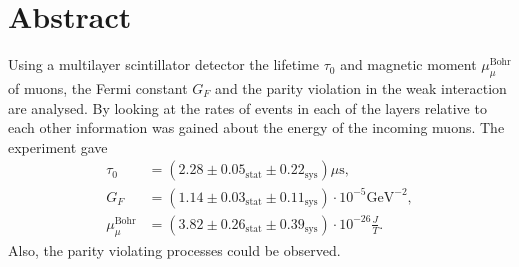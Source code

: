 \section{Abstract}
Using a multilayer scintillator detector the lifetime $\tau_0$ and magnetic moment $\mu_\mu^{\text{Bohr}}$ of muons, the Fermi constant $G_F$ and the parity violation in the weak interaction are analysed. By looking at the rates of events in each of the layers relative to each other information was gained about the energy of the incoming muons. The experiment gave
\begin{align*}
	\tau_0&=(2.28\pm0.05_{\text{stat}}\pm0.22_{\text{sys}})\mu\text{s},\\
	G_F &= (1.14 \pm 0.03_{\text{stat}} \pm 0.11_{\text{sys}})\cdot 10^{-5}\text{GeV}^{-2},\\
	\mu_{\mu}^{\text{Bohr}} &= (3.82\pm0.26_{\text{stat}}\pm0.39_{\text{sys}})\cdot10^{-26}\frac{J}{T}.
\end{align*}
Also, the parity violating processes could be observed. 